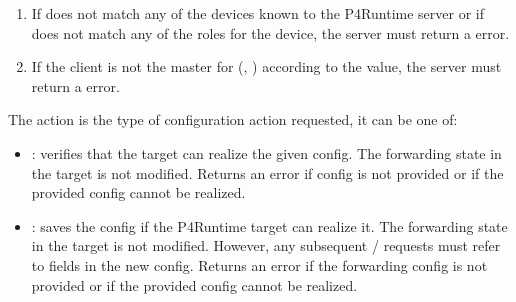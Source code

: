 \documentclass[11pt]{article}
\begin{document}
{%
\begin{enumerate}%

\item{}
If  does not match any of the devices known to the P4Runtime
server or if  does not match any of the roles for the device, the
server must return a  error.%

\item{}
If the client is not the master for (, ) according to the
 value, the server must return a  error.%
\end{enumerate}%

\noindent{}The action is the type of configuration action requested, it can be one of:%

\begin{itemize}%

\item{}
: verifies that the target can realize the given config. The
forwarding state in the target is not modified. Returns an 
error if config is not provided or if the provided config cannot be realized.%

\item{}
: saves the config if the P4Runtime target can realize
it. The forwarding state in the target is not modified. However, any
subsequent  /  requests must refer to fields in the new
config. Returns an  error if the forwarding config is not
provided or if the provided config cannot be realized.%


\end{itemize}}
\end{document}
